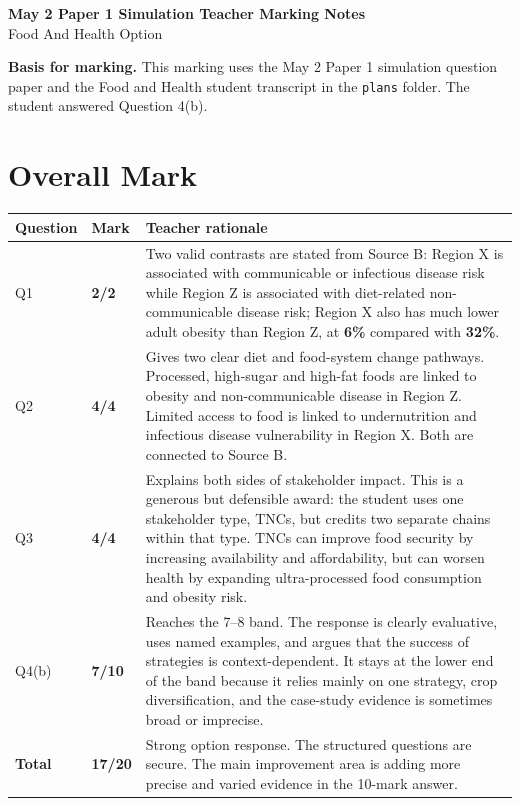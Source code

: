 \documentclass[11pt,a4paper]{article}
\newcommand{\term}[1]{\textcolor{HeadingBlue}{\textbf{#1}}}
\newcommand{\score}[1]{\textcolor{AccentTeal}{\textbf{#1}}}
\newcommand{\boxnote}[3]{%
\noindent\colorbox{#1}{%
  \begin{minipage}{0.965\textwidth}
  \sffamily
  \textbf{\textcolor{HeadingBlue}{#2}} #3
  \end{minipage}
}}
\begin{document}
\begin{center}
  {\sffamily\bfseries\color{HeadingBlue}\LARGE May 2 Paper 1 Simulation Teacher Marking Notes}\\[0.25em]
  {\sffamily\color{AccentTeal}\large Food And Health Option}
\end{center}

\boxnote{SoftBlue}{Basis for marking.}{This marking uses the May 2 Paper 1
simulation question paper and the Food and Health student transcript in the
\texttt{plans} folder. The student answered Question 4(b).}

\section{Overall Mark}

\begin{tabularx}{\textwidth}{L{0.18\textwidth}L{0.14\textwidth}Y}
\toprule
\textbf{Question} & \textbf{Mark} & \textbf{Teacher rationale} \\
\midrule
Q1 & \score{2/2} & Two valid contrasts are stated from Source B: Region X is
associated with communicable or infectious disease risk while Region Z is
associated with diet-related non-communicable disease risk; Region X also has
much lower adult obesity than Region Z, at \term{6\%} compared with
\term{32\%}. \\
Q2 & \score{4/4} & Gives two clear diet and food-system change pathways.
Processed, high-sugar and high-fat foods are linked to obesity and
non-communicable disease in Region Z. Limited access to food is linked to
undernutrition and infectious disease vulnerability in Region X. Both are
connected to Source B. \\
Q3 & \score{4/4} & Explains both sides of stakeholder impact. This is a
generous but defensible award: the student uses one stakeholder type, TNCs, but
credits two separate chains within that type. TNCs can improve food security by
increasing availability and affordability, but can worsen health by expanding
ultra-processed food consumption and obesity risk. \\
Q4(b) & \score{7/10} & Reaches the 7--8 band. The response is clearly
evaluative, uses named examples, and argues that the success of strategies is
context-dependent. It stays at the lower end of the band because it relies
mainly on one strategy, crop diversification, and the case-study evidence is
sometimes broad or imprecise. \\
\midrule
\textbf{Total} & \score{17/20} & Strong option response. The structured
questions are secure. The main improvement area is adding more precise and
varied evidence in the 10-mark answer. \\
\bottomrule
\end{tabularx}
\end{document}

